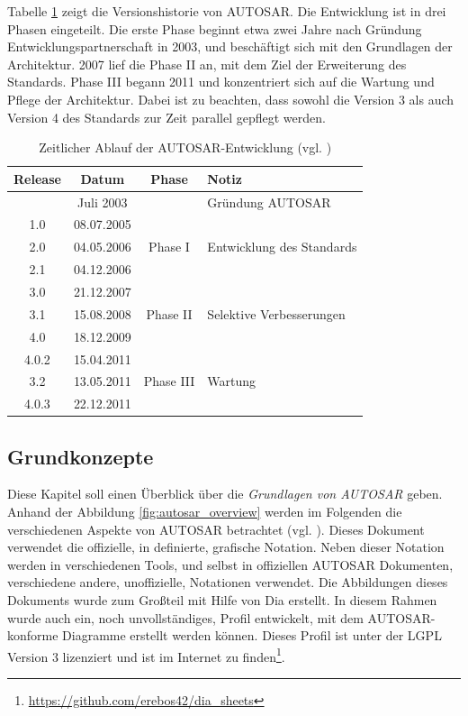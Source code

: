 \documentclass[
  a4paper,					    %
  twoside,
  DIV=calc,     				%
  bibliography=totoc,
  cleardoublepage=empty,
  ngerman,     					%
  final       					%
]{scrbook}
\begin{document}
Tabelle \ref{tab:timeline} zeigt die Versionshistorie von AUTOSAR. Die Entwicklung ist in drei Phasen eingeteilt. Die erste Phase beginnt etwa zwei Jahre nach Gründung Entwicklungspartnerschaft in 2003, und beschäftigt sich mit den Grundlagen der Architektur. 2007 lief die Phase II an, mit dem Ziel der Erweiterung des Standards. Phase III begann 2011 und konzentriert sich auf die Wartung und Pflege der Architektur. Dabei ist zu beachten, dass sowohl die Version 3 als auch Version 4 des Standards zur Zeit parallel gepflegt werden.

\begin{table}[h]
    \centering
    \begin{tabular}[h]{c c c l}
    \toprule
    Release & Datum & Phase & Notiz\\
    \midrule
          & Juli 2003  &  & Gründung AUTOSAR\\
    \midrule
    1.0   & 08.07.2005 & \multirow{3}{*}{Phase I} & \\
    2.0	  & 04.05.2006 &  & Entwicklung des Standards\\
    2.1	  & 04.12.2006 &  & \\
    \midrule
    3.0	  & 21.12.2007 & \multirow{3}{*}{Phase II} & \\
    3.1	  & 15.08.2008 &  & Selektive Verbesserungen\\
    4.0	  & 18.12.2009 &  & \\
    \midrule
    4.0.2 & 15.04.2011 & \multirow{3}{*}{Phase III} & \\
    3.2	  & 13.05.2011 &  & Wartung\\
    4.0.3 & 22.12.2011 &  & \\
    \bottomrule
    \end{tabular}
    \caption{Zeitlicher Ablauf der AUTOSAR-Entwicklung (vgl. \cite{as_background}\cite{as_roadmap}\cite{wiki:autosar_de})}
    \label{tab:timeline}
\end{table}








\subsection{Grundkonzepte}
\label{sec:Grundkonzepte}
Diese Kapitel soll einen Überblick über die \emph{Grundlagen von AUTOSAR} geben. Anhand der Abbildung \ref{fig:autosar_overview} werden im Folgenden die verschiedenen Aspekte von AUTOSAR betrachtet (vgl. \cite{autosar_techoverview}). Dieses Dokument verwendet die offizielle, in \cite{autosar_graph} definierte, grafische Notation. Neben dieser Notation werden in verschiedenen Tools, und selbst in offiziellen AUTOSAR Dokumenten, verschiedene andere, unoffizielle, Notationen verwendet. Die Abbildungen dieses Dokuments wurde zum Großteil mit Hilfe von Dia erstellt. In diesem Rahmen wurde auch ein, noch unvollständiges, Profil entwickelt, mit dem AUTOSAR-konforme Diagramme erstellt werden können. Dieses Profil ist unter der LGPL Version 3 lizenziert und ist im Internet zu finden\footnote{\url{https://github.com/erebos42/dia_sheets}}.
\end{document}
